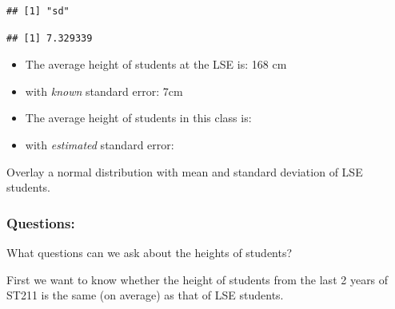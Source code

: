 \documentclass[
]{gitbook}
\newenvironment{Shaded}{\begin{snugshade}}{\end{snugshade}}
\newcommand{\CommentTok}[1]{\textcolor[rgb]{0.56,0.35,0.01}{\textit{#1}}}
\newcommand{\FunctionTok}[1]{\textcolor[rgb]{0.00,0.00,0.00}{#1}}
\newcommand{\NormalTok}[1]{#1}
\newcommand{\SpecialCharTok}[1]{\textcolor[rgb]{0.00,0.00,0.00}{#1}}
\providecommand{\tightlist}{%
  \setlength{\itemsep}{0pt}\setlength{\parskip}{0pt}}
\begin{document}
\begin{verbatim}
## [1] "sd"
\end{verbatim}

\begin{Shaded}
\end{Shaded}

\begin{verbatim}
## [1] 7.329339
\end{verbatim}

\begin{Shaded}
\end{Shaded}

\begin{itemize}
\tightlist
\item
  The average height of students at the LSE is: 168 cm\\
\item
  with \emph{known} standard error: 7cm\\
\item
  The average height of students in this class is:
\item
  with \emph{estimated} standard error:
\end{itemize}

Overlay a normal distribution with mean and standard deviation of LSE students.

\hypertarget{questions}{%
\subsubsection{Questions:}\label{questions}}

What questions can we ask about the heights of students?

First we want to know whether the height of students from the last 2 years of ST211 is the same (on average) as that of LSE students.

\end{document}
